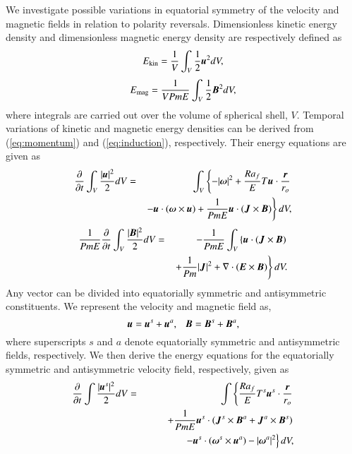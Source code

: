 We investigate possible variations in equatorial symmetry of the velocity and magnetic fields in relation to polarity reversals.
Dimensionless kinetic energy density and dimensionless magnetic energy density are respectively defined as
%
\begin{equation}
E_{\rm kin} = \frac{1}{V}
  \int_V \frac{1}{2} \mbox{\boldmath$u$}^2 d V ,
\label{eq:Ekin}
\end{equation}
%
\begin{equation}
E_{\rm mag} = \frac{1}{V Pm E}
  \int_V \frac{1}{2} \mbox{\boldmath$B$}^2 d V ,
\label{eq:Emag}
\end{equation}
%
where integrals are carried out over the volume of spherical shell, $V$.
Temporal variations of kinetic and magnetic energy densities can be derived from (\ref{eq:momentum}) and (\ref{eq:induction}), respectively.
Their energy equations are given as
%
\begin{eqnarray}
\frac{\partial}{\partial t}
 \int_V \frac{|\mbox{\boldmath$u$}|^2}{2} d V
 &=& \int_V \left\{
    - |\mbox{\boldmath$\omega$}|^2 
    + \frac{Ra_f}{E}T \mbox{\boldmath$u$}\cdot 
    \frac{\mbox{\boldmath$r$}}{r_o}
      \right.
\nonumber \\
 & & \left.
    - \mbox{\boldmath$u$} \cdot (\mbox{\boldmath$\omega$}\times\mbox{\boldmath$u$})
    + \frac{1}{Pm E} \mbox{\boldmath$u$} \cdot
                     (\mbox{\boldmath$J$} \times \mbox{\boldmath$B$})
      \right\} d V,
\label{eq:energy_u}
\end{eqnarray}
%
\begin{eqnarray}
\frac{1}{Pm E}\frac{\partial}{\partial t}
 \int_V \frac{|\mbox{\boldmath$B$}|^2}{2} d V
  & = & 
- \frac{1}{Pm E}\int_V \left\{
      \mbox{\boldmath$u$} \cdot ( \mbox{\boldmath$J$} \times \mbox{\boldmath$B$} )
\right. \nonumber \\
 & &    \left.
    + \frac{1}{Pm} |\mbox{\boldmath$J$}|^2
    + \nabla \cdot ( \mbox{\boldmath$E$} \times \mbox{\boldmath$B$} ) 
      \right\} d V.
\label{eq:energy_B}
\end{eqnarray}
%
Any vector can be divided into equatorially symmetric and antisymmetric constituents.
We represent the velocity and magnetic field as,
%
\begin{equation}
\mbox{\boldmath$u$} = \mbox{\boldmath$u$}^s + \mbox{\boldmath$u$}^a, ~~~
\mbox{\boldmath$B$} = \mbox{\boldmath$B$}^s + \mbox{\boldmath$B$}^a,
\label{eq:eqas}
\end{equation}
%
where superscripts $s$ and $a$ denote equatorially symmetric and antisymmetric fields, respectively.
We then derive the energy equations for the equatorially symmetric and antisymmetric velocity field, respectively, given as
%
\begin{eqnarray}
\displaystyle
\frac{\partial}{\partial t}
 \int \frac{|\mbox{\boldmath$u$}^s|^2}{2} d V 
 &=& \int \left\{
      \frac{Ra_f}{E}T^s \mbox{\boldmath$u$}^s\cdot \frac{\mbox{\boldmath$r$}}{r_{o}}
     \right.
\nonumber \\
& & \displaystyle
\hspace*{2em}
     \left.
    + \frac{1}{Pm E} \mbox{\boldmath$u$}^s \cdot
                (\mbox{\boldmath$J$}^s \times \mbox{\boldmath$B$}^a
                +\mbox{\boldmath$J$}^a \times \mbox{\boldmath$B$}^s)
      \right.
\nonumber \\
& &\displaystyle
\hspace*{3em}
      \left.
    - \mbox{\boldmath$u$}^s \cdot 
       (\mbox{\boldmath$\omega$}^s \times \mbox{\boldmath$u$}^a)
    - |\mbox{\boldmath$\omega$}^a|^2 
      \right\} d V,
\label{eq:energy_us}
\end{eqnarray}
